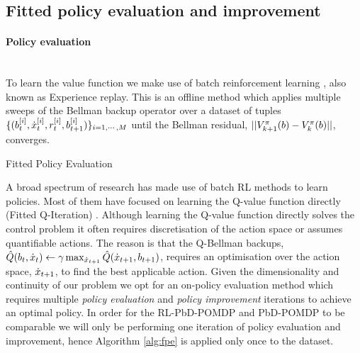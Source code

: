 
\subsection{Fitted policy evaluation and improvement}

\paragraph{Policy evaluation}\\

To learn the value function we make use of batch reinforcement learning \cite{EGW05}, also known as Experience replay.
This is an offline method which applies multiple sweeps of the Bellman backup operator 
over a dataset of tuples $\{(b^{[i]}_t,\dot{x}^{[i]}_t,r^{[i]}_{t},b^{[i]}_{t+1})\}_{i=1,\cdots,M}$ until the Bellman residual,
$||V^{\pi}_{k+1}(b) - V^{\pi}_{k}(b)||$, converges. 

\begin{center}
\begin{minipage}{.65\linewidth}
\begin{algorithm}[H]
\label{alg:fpe}
\BlankLine
{}
\caption{Fitted Policy Evaluation}
\end{algorithm} 
\end{minipage}
\end{center}
A broad spectrum of research has made use of batch RL methods to learn policies. 
Most of them have focused on learning the Q-value function directly (Fitted Q-Iteration) 
\cite{NIPS2008_3501,EGW05,Riedmiller05neuralfitted}. Although learning the 
Q-value function directly solves the control problem it often requires discretisation 
of the action space or assumes quantifiable actions. The reason is that the 
Q-Bellman backups, $\hat{Q}(b_t,\dot{x}_t) \leftarrow \gamma \max_{\dot{x}_{t+1}} \hat{Q}(\dot{x}_{t+1},b_{t+1})$, 
requires an optimisation over the action space, $\dot{x}_{t+1}$, to find the best applicable action. 
Given the dimensionality and continuity of our problem we opt for an on-policy evaluation method
which requires multiple \textit{policy evaluation} and \textit{policy improvement} iterations to achieve an optimal policy.
In order for the RL-PbD-POMDP and PbD-POMDP to be comparable we will only be performing one iteration of policy evaluation
and improvement, hence Algorithm \ref{alg:fpe} is applied only once to the dataset.

